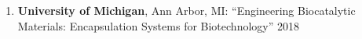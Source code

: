 
\begin{cvparagraph}
\begin{enumerate}
	\item	{\textbf{University of Michigan}, Ann Arbor, MI: “Engineering Biocatalytic Materials: Encapsulation Systems for Biotechnology” 2018}


\end{enumerate}
\end{cvparagraph}

